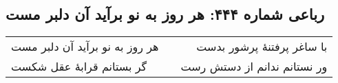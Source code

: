 \begin{center}
\section*{رباعی شماره ۴۴۴: هر روز به نو برآید آن دلبر مست}
\label{sec:0444}
\begin{longtable}{l p{0.5cm} r}
هر روز به نو برآید آن دلبر مست
&&
با ساغر پرفتنهٔ پرشور بدست
\\
گر بستانم قرابهٔ عقل شکست
&&
ور نستانم ندانم از دستش رست
\\
\end{longtable}
\end{center}
